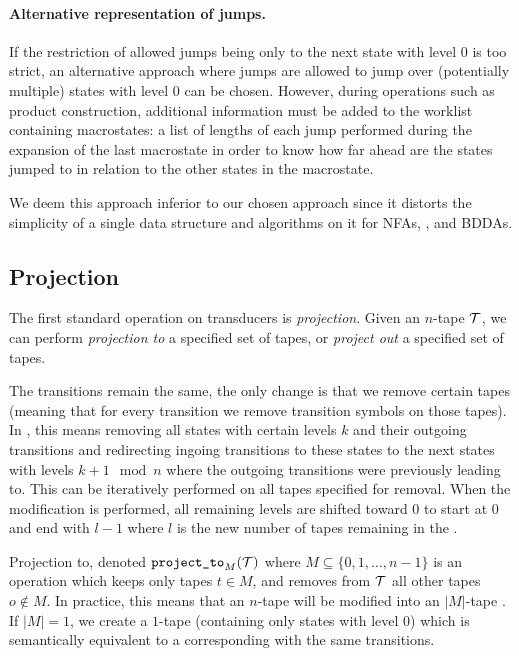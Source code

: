 \paragraph{Alternative representation of jumps.}
If the restriction of allowed jumps being only to the next state with level $0$ is too strict, an alternative approach where jumps are allowed to jump over (potentially multiple) states with level $0$ can be chosen.
However, during operations such as product construction, additional information must be added to the worklist containing macrostates: a list of lengths of each jump performed during the expansion of the last macrostate in order to know how far ahead are the states jumped to in relation to the other states in the macrostate.

We deem this approach inferior to our chosen approach since it distorts the simplicity of a single data structure and algorithms on it for NFAs, \nfts, and BDDAs.

\subsection{Projection}\label{sec:projection}

The first standard operation on transducers is \emph{projection}.
Given an $n$-tape \nft $\mathcal{T}$, we can perform \emph{projection to} a specified set of tapes, or \emph{project out} a specified set of tapes.

The transitions remain the same, the only change is that we remove certain tapes (meaning that for every \nft transition we remove transition symbols on those tapes).
In \mata, this means removing all states with certain levels $k$ and their outgoing transitions and redirecting ingoing transitions to these states to the next states with levels $k + 1 \mod n$ where the outgoing transitions were previously leading to.
This can be iteratively performed on all tapes specified for removal.
When the modification is performed, all remaining levels are shifted toward $0$ to start at $0$ and end with $l - 1$ where $l$ is the new number of tapes remaining in the \nft.

Projection to, denoted $\texttt{project\_to}_{M}(\mathcal{T})$ where $M \subseteq \{ 0, 1, \ldots, n - 1 \} $ is an operation which keeps only tapes $t \in M$, and removes from $\mathcal{T}$ all other tapes $o \notin M$.
In practice, this means that an $n$-tape \nft will be modified into an $|M|$-tape \nft.
If $|M| = 1$, we create a $1$-tape \nft (containing only states with level $0$) which is semantically equivalent to a corresponding \nfa with the same transitions.

